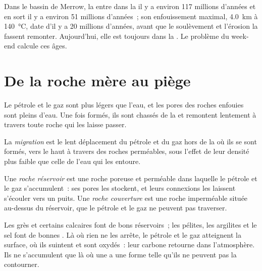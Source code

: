 Dans le bassin de Merrow, la  entre dans la  il y
a environ 117 millions d'années et en sort il y a environ 51 millions
d'années~; son enfouissement maximal, \qty{4.0}{km} à
\qty{140}{\degreeCelsius}, date d'il y a 20 millions d'années, avant que le
soulèvement et l'érosion la fassent remonter. Aujourd'hui, elle est
toujours dans la . Le problème du week-end calcule ces âges.

\section{De la roche mère au piège}

Le pétrole et le gaz sont plus légers que l'eau, et les pores des roches
enfouies sont pleins d'eau. Une fois formés, ils sont chassés de la  et remontent lentement à travers toute roche qui les laisse passer.

\begin{definition}[Migration]\label{def:g11:fossil-fuel-geology:migration}
La \emph{migration}
est le lent déplacement du pétrole et du gaz hors de la  où ils
se sont formés, vers le haut à travers des roches perméables, sous l'effet
de leur densité plus faible que celle de l'eau qui les entoure.
\end{definition}

\begin{definition}\label{def:g11:fossil-fuel-geology:reservoir}
Une \emph{roche réservoir} est une
roche poreuse et perméable dans laquelle le pétrole et le gaz
s'accumulent~: ses pores les stockent, et leurs connexions les laissent
s'écouler vers un puits. Une \emph{roche couverture}
est une roche imperméable située au-dessus du réservoir, que le pétrole et
le gaz ne peuvent pas traverser.
\end{definition}

Les grès et certains calcaires font de bons réservoirs~; les pélites, les
argilites et le sel font de bonnes . Là où rien ne les arrête, le
pétrole et le gaz atteignent la surface, où ils suintent et sont oxydés~:
leur carbone retourne dans l'atmosphère. Ils ne s'accumulent que là où une
 a une forme telle qu'ils ne peuvent pas la contourner.

